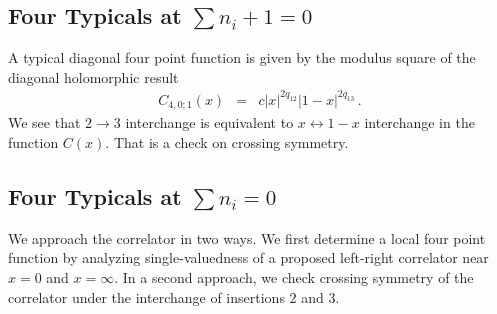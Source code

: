 \documentclass[12pt]{article}
\numberwithin{equation}{section}
\numberwithin{equation}{section}
\numberwithin{table}{section}\setlength{\multlinegap}{25pt}
\begin{document}
\subsection{Four Typicals at $\sum n_i+1=0$}
A typical diagonal four point function is given by the modulus square of the diagonal holomorphic result
\begin{eqnarray}
C_{4,0;1}(x) 
&=& c |x|^{2 q_{12}} |1-x|^{2q_{13}} 
\, .
\end{eqnarray}
We see that $2 \rightarrow 3$ interchange is equivalent to $x \leftrightarrow 1-x$ interchange in the function $C(x)$.
That is a check on crossing symmetry.
\subsection{Four Typicals  at $\sum n_i=0$}
We approach the correlator in two ways. We first determine a local four point function
by analyzing single-valuedness of a proposed left-right correlator near $x=0$ and $x=\infty$. In a second approach,
we check crossing symmetry of the correlator under the interchange of insertions $2$ and $3$.
\end{document}

